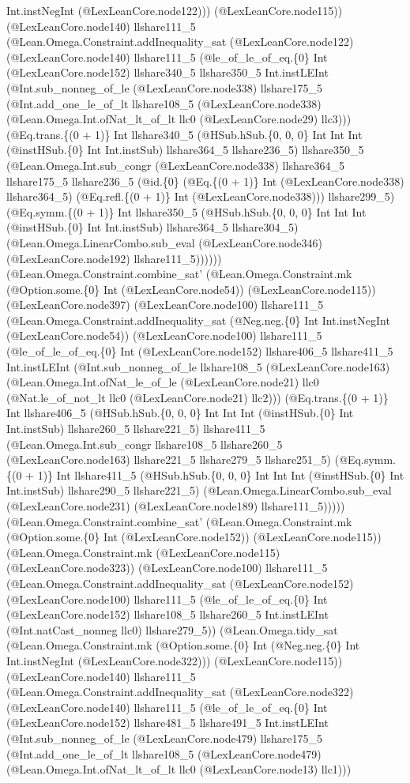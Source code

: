 \documentclass[11pt]{article}
\begin{document}
Int.instNegInt (@LexLeanCore.node122))) (@LexLeanCore.node115)) (@LexLeanCore.node140) llshare111\_5 (@Lean.Omega.Constraint.addInequality\_sat (@LexLeanCore.node122) (@LexLeanCore.node140) llshare111\_5 (@le\_of\_le\_of\_eq.\{0\} Int (@LexLeanCore.node152) llshare340\_5 llshare350\_5 Int.instLEInt (@Int.sub\_nonneg\_of\_le (@LexLeanCore.node338) llshare175\_5 (@Int.add\_one\_le\_of\_lt llshare108\_5 (@LexLeanCore.node338) (@Lean.Omega.Int.ofNat\_lt\_of\_lt llc0 (@LexLeanCore.node29) llc3))) (@Eq.trans.\{(0 + 1)\} Int llshare340\_5 (@HSub.hSub.\{0, 0, 0\} Int Int Int (@instHSub.\{0\} Int Int.instSub) llshare364\_5 llshare236\_5) llshare350\_5 (@Lean.Omega.Int.sub\_congr (@LexLeanCore.node338) llshare364\_5 llshare175\_5 llshare236\_5 (@id.\{0\} (@Eq.\{(0 + 1)\} Int (@LexLeanCore.node338) llshare364\_5) (@Eq.refl.\{(0 + 1)\} Int (@LexLeanCore.node338))) llshare299\_5) (@Eq.symm.\{(0 + 1)\} Int llshare350\_5 (@HSub.hSub.\{0, 0, 0\} Int Int Int (@instHSub.\{0\} Int Int.instSub) llshare364\_5 llshare304\_5) (@Lean.Omega.LinearCombo.sub\_eval (@LexLeanCore.node346) (@LexLeanCore.node192) llshare111\_5)))))) (@Lean.Omega.Constraint.combine\_sat' (@Lean.Omega.Constraint.mk (@Option.some.\{0\} Int (@LexLeanCore.node54)) (@LexLeanCore.node115)) (@LexLeanCore.node397) (@LexLeanCore.node100) llshare111\_5 (@Lean.Omega.Constraint.addInequality\_sat (@Neg.neg.\{0\} Int Int.instNegInt (@LexLeanCore.node54)) (@LexLeanCore.node100) llshare111\_5 (@le\_of\_le\_of\_eq.\{0\} Int (@LexLeanCore.node152) llshare406\_5 llshare411\_5 Int.instLEInt (@Int.sub\_nonneg\_of\_le llshare108\_5 (@LexLeanCore.node163) (@Lean.Omega.Int.ofNat\_le\_of\_le (@LexLeanCore.node21) llc0 (@Nat.le\_of\_not\_lt llc0 (@LexLeanCore.node21) llc2))) (@Eq.trans.\{(0 + 1)\} Int llshare406\_5 (@HSub.hSub.\{0, 0, 0\} Int Int Int (@instHSub.\{0\} Int Int.instSub) llshare260\_5 llshare221\_5) llshare411\_5 (@Lean.Omega.Int.sub\_congr llshare108\_5 llshare260\_5 (@LexLeanCore.node163) llshare221\_5 llshare279\_5 llshare251\_5) (@Eq.symm.\{(0 + 1)\} Int llshare411\_5 (@HSub.hSub.\{0, 0, 0\} Int Int Int (@instHSub.\{0\} Int Int.instSub) llshare290\_5 llshare221\_5) (@Lean.Omega.LinearCombo.sub\_eval (@LexLeanCore.node231) (@LexLeanCore.node189) llshare111\_5))))) (@Lean.Omega.Constraint.combine\_sat' (@Lean.Omega.Constraint.mk (@Option.some.\{0\} Int (@LexLeanCore.node152)) (@LexLeanCore.node115)) (@Lean.Omega.Constraint.mk (@LexLeanCore.node115) (@LexLeanCore.node323)) (@LexLeanCore.node100) llshare111\_5 (@Lean.Omega.Constraint.addInequality\_sat (@LexLeanCore.node152) (@LexLeanCore.node100) llshare111\_5 (@le\_of\_le\_of\_eq.\{0\} Int (@LexLeanCore.node152) llshare108\_5 llshare260\_5 Int.instLEInt (@Int.natCast\_nonneg llc0) llshare279\_5)) (@Lean.Omega.tidy\_sat (@Lean.Omega.Constraint.mk (@Option.some.\{0\} Int (@Neg.neg.\{0\} Int Int.instNegInt (@LexLeanCore.node322))) (@LexLeanCore.node115)) (@LexLeanCore.node140) llshare111\_5 (@Lean.Omega.Constraint.addInequality\_sat (@LexLeanCore.node322) (@LexLeanCore.node140) llshare111\_5 (@le\_of\_le\_of\_eq.\{0\} Int (@LexLeanCore.node152) llshare481\_5 llshare491\_5 Int.instLEInt (@Int.sub\_nonneg\_of\_le (@LexLeanCore.node479) llshare175\_5 (@Int.add\_one\_le\_of\_lt llshare108\_5 (@LexLeanCore.node479) (@Lean.Omega.Int.ofNat\_lt\_of\_lt llc0 (@LexLeanCore.node13) llc1))) 
\end{document}
